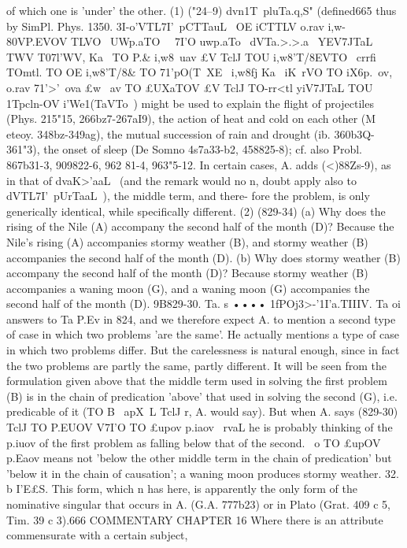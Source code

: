 {{{{{{{{{{{{{{{{{{{{{{{{{{{{{{{{{{{{{{{{{{{{{{{{{{{{{{{{{{{{{{{{{{{{{of which one is 'under' the other. (1) ("24--9) dvn1T~pluTa.q,S" (defined665
thus by SimPl. Phys. 1350. 3I-o'VTL7I'~p{CTTauL~ OE iCTTLV o.rav i,w-
80VP.EVOV TLVO~ UWp.aTO~ ~7I'O uwp.aTo~ dVTa.>.>.a~ YEV7JTaL TWV T07l'WV,
Ka~ TO P.& i,w8~uav £V TclJ TOU i,w8'T/8EVTO~ crrfi TOmtl. TO OE i,w8'T/8&
TO 71'pO(T~XE~ i,w8fj Ka~ iK~rVO TO iX6p.~ov, o.rav 71'>'~{ova
£w~ av TO
£UXaTOV £V TclJ TO-rr<tl yiV7JTaL TOU 1Tpcln-OV i'We1}(TaVTo~) might be used
to explain the flight of projectiles (Phys. 215"15, 266bz7-267aI9),
the action of heat and cold on each other (M eteoy. 348bz-349ag),
the mutual succession of rain and drought (ib. 360b3Q-361"3),
the onset of sleep (De Somno 4s7a33-b2, 458825-8); cf. also
Probl. 867b31-3, 909822-6, 962 81-4, 963"5-12. In certain cases, A.
adds (<)88Zs-9), as in that of dvaK>'aaL~ (and the remark would no
n,
doubt apply also to dVTL7I'~pUrTaaL~), the middle term, and there-
fore the problem, is only generically identical, while specifically
different. (2) (829-34) (a) Why does the rising of the Nile (A)
accompany the second half of the month (D)? Because the Nile's
rising (A) accompanies stormy weather (B), and stormy weather
(B) accompanies the second half of the month (D). (b) Why
does stormy weather (B) accompany the second half of the
month (D)? Because stormy weather (B) accompanies a waning
moon (G), and a waning moon (G) accompanies the second half
of the month (D).
9B829-30. Ta. s •••• 1fPOj3>-'1I'a.TIIIV. Ta oi answers to Ta P.Ev in
824, and we therefore expect A. to mention a second type of case
in which two problems 'are the same'. He actually mentions a
type of case in which two problems differ. But the carelessness
is natural enough, since in fact the two problems are partly the
same, partly different.
It will be seen from the formulation given above that the
middle term used in solving the first problem (B) is in the chain
of predication 'above' that used in solving the second (G), i.e.
predicable of it (TO B ~apX~L TclJ r, A. would say). But when A.
says (829-30) TclJ TO P.EUOV V7I'O TO £upov p.iaov ~rvaL he is probably
thinking of the p.iuov of the first problem as falling below that of
the second. ~o TO £upOV p.Eaov means not 'below the other
middle term in the chain of predication' but 'below it in the chain
of causation'; a waning moon produces stormy weather.
32. b I'E£S. This form, which n has here, is apparently the
only form of the nominative singular that occurs in A. (G.A.
777b23) or in Plato (Grat. 409 c 5, Tim. 39 c 3).666
COMMENTARY
CHAPTER 16
Where there is an attribute commensurate with a certain subject,
}}}}}}}}}}}}}}}}}}}}}}}}}}}}}}}}}}}}}}}}}}}}}}}}}}}}}}}}}}}}}}}}}}}}}}
